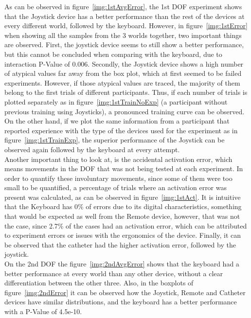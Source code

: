 As can be observed in figure~\ref{img:1stAvgError}, the 1st DOF experiment shows that the Joystick device has a better performance than the rest of the devices at every different world, followed by the keyboard. However, in figure~\ref{img:1stError} when showing all the samples from the 3 worlds together, two important things are observed. First, the joystick device seems to still show a better performance, but this cannot be concluded when comparing with the keyboard, due to interaction P-Value of 0.006. Secondly, the Joystick device shows a high number of atypical values far away from the box plot, which at first seemed to be failed experiments. However, if those atypical values are traced, the majority of them belong to the first trials of different participants. Thus, if each number of trials is plotted separately as in figure~\ref{img:1stTrainNoExp} (a participant without previous training using Joysticks), a pronounced training curve can be observed. On the other hand, if we plot the same information from a participant that reported experience with the type of the devices used for the experiment as in figure~\ref{img:1stTrainExp}, the superior performance of the Joystick can be observed again followed by the keyboard at every attempt.\\

Another important thing to look at, is the accidental activation error, which means movements in the DOF that was not being tested at each experiment. In order to quantify these involuntary movements, since some of them were too small to be quantified, a percentage of trials where an activation error was present was calculated, as can be observed in figure~\ref{img:1stAct}. It is intuitive that the Keyboard has 0\% of errors due to its digital characteristics, something that would be expected as well from the Remote device, however, that was not the case, since 2.7\% of the cases had an activation error, which can be attributed to experiment errors or issues with the ergonomics of the device. Finally, it can be observed that the catheter had the higher activation error, followed by the joystick.\\

On the 2nd DOF the figure~\ref{img:2ndAvgError} shows that the keyboard had a better performance at every world than any other device, without a clear differentiation between the other three. Also, in the boxplots of figure~\ref{img:2ndError} it can be observed how the Joystick, Remote and Catheter devices have similar distributions, and the keyboard has a better performance with a P-Value of 4.5e-10.\\

